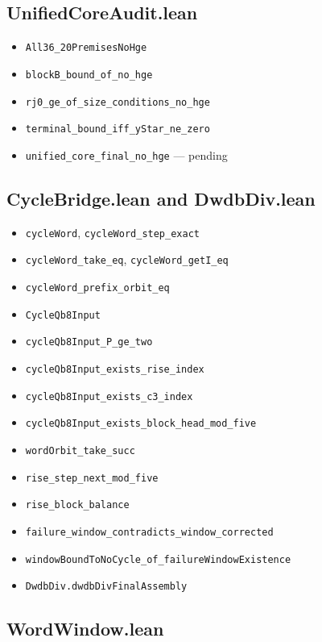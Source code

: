 \subsection{UnifiedCoreAudit.lean}

\begin{itemize}[leftmargin=*]
\item \texttt{All36\_20PremisesNoHge}
\item \texttt{blockB\_bound\_of\_no\_hge}
\item \texttt{rj0\_ge\_of\_size\_conditions\_no\_hge}
\item \texttt{terminal\_bound\_iff\_yStar\_ne\_zero}
\item \texttt{unified\_core\_final\_no\_hge} --- pending
\end{itemize}

\subsection{CycleBridge.lean and DwdbDiv.lean}

\begin{itemize}[leftmargin=*]
\item \texttt{cycleWord}, \texttt{cycleWord\_step\_exact}
\item \texttt{cycleWord\_take\_eq}, \texttt{cycleWord\_getI\_eq}
\item \texttt{cycleWord\_prefix\_orbit\_eq}
\item \texttt{CycleQb8Input}
\item \texttt{cycleQb8Input\_P\_ge\_two}
\item \texttt{cycleQb8Input\_exists\_rise\_index}
\item \texttt{cycleQb8Input\_exists\_c3\_index}
\item \texttt{cycleQb8Input\_exists\_block\_head\_mod\_five}
\item \texttt{wordOrbit\_take\_succ}
\item \texttt{rise\_step\_next\_mod\_five}
\item \texttt{rise\_block\_balance}
\item \texttt{failure\_window\_contradicts\_window\_corrected}
\item \texttt{windowBoundToNoCycle\_of\_failureWindowExistence}
\item \texttt{DwdbDiv.dwdbDivFinalAssembly}
\end{itemize}

\subsection{WordWindow.lean}

